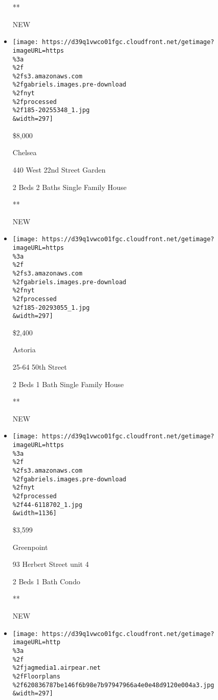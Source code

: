 \begin{itemize}
  **

  NEW
\item
  \href{/real-estate/usa/ny/new-york/chelsea/homes-for-rent/440-west-22nd-street-garden/185-20255348?}{}

  \texttt{[image: https://d39q1vwco01fgc.cloudfront.net/getimage?imageURL=https\\\%3a\\\%2f\\\%2fs3.amazonaws.com\\\%2fgabriels.images.pre-download\\\%2fnyt\\\%2fprocessed\\\%2f185-20255348\_1.jpg\\\&width=297]}

  \$8,000

  Chelsea

  440 West 22nd Street Garden

  2 Beds \textbar{} 2 Baths \textbar{} Single Family House

  **

  NEW
\item
  \href{/real-estate/usa/ny/queens/astoria/homes-for-rent/25-64-50th-street/185-20293055?}{}

  \texttt{[image: https://d39q1vwco01fgc.cloudfront.net/getimage?imageURL=https\\\%3a\\\%2f\\\%2fs3.amazonaws.com\\\%2fgabriels.images.pre-download\\\%2fnyt\\\%2fprocessed\\\%2f185-20293055\_1.jpg\\\&width=297]}

  \$2,400

  Astoria

  25-64 50th Street

  2 Beds \textbar{} 1 Bath \textbar{} Single Family House

  **

  NEW
\item
  \href{/real-estate/usa/ny/brooklyn/greenpoint/homes-for-rent/93-herbert-street/44-6118702?}{}

  \texttt{[image: https://d39q1vwco01fgc.cloudfront.net/getimage?imageURL=https\\\%3a\\\%2f\\\%2fs3.amazonaws.com\\\%2fgabriels.images.pre-download\\\%2fnyt\\\%2fprocessed\\\%2f44-6118702\_1.jpg\\\&width=1136]}

  \$3,599

  Greenpoint

  93 Herbert Street unit 4

  2 Beds \textbar{} 1 Bath \textbar{} Condo

  **

  NEW
\item
  \href{/real-estate/usa/ny/new-york/lower-east-side/homes-for-rent/268-east-broadway/209-RPLU-62412031953?}{}

  \texttt{[image: https://d39q1vwco01fgc.cloudfront.net/getimage?imageURL=http\\\%3a\\\%2f\\\%2fjagmedia1.airpear.net\\\%2fFloorplans\\\%2f620836787be146f6b98e7b97947966a4e0e48d9120e004a3.jpg\\\&width=297]}


\end{itemize}

